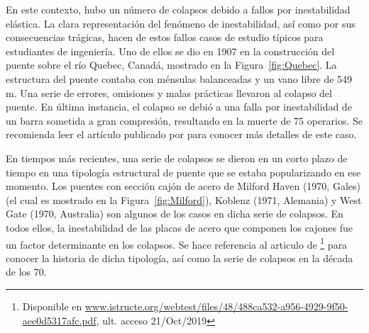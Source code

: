 En este contexto, hubo un número de colapsos debido a fallos por inestabilidad elástica. La clara representación del fenómeno de inestabilidad, así como por sus consecuencias trágicas, hacen de estos fallos casos de estudio típicos para estudiantes de ingeniería. Uno de ellos se dio en 1907 en la construcción del puente sobre el río Quebec, Canadá, mostrado en la Figura~\ref{fig:Quebec}. La estructura del puente contaba con ménsulas balanceadas y un vano libre de 549 m. Una serie de errores, omisiones y malas prácticas llevaron al colapso del puente. En última instancia, el colapso se debió a una falla por inestabilidad de un barra sometida a gran compresión, resultando en la muerte de 75 operarios. Se recomienda leer el artículo publicado por \cite{Brady} para conocer más detalles de este caso.


En tiempos más recientes, una serie de colapsos se dieron en un corto plazo de tiempo en una tipología estructural de puente que se estaba popularizando en ese momento. Los puentes con sección cajón de acero de Milford Haven (1970, Gales) (el cual es mostrado en la Figura~\ref{fig:Milford}), Koblenz (1971, Alemania) y West Gate (1970, Australia) son algunos de los casos en dicha serie de colapsos. En todos ellos, la inestabilidad de las placas de acero que componen los cajones fue un factor determinante en los colapsos. Se hace referencia al articulo de \cite{Firth}\footnote{Disponible en \href{https://www.istructe.org/webtest/files/48/488ca532-a956-4929-9f50-aee0d5317afc.pdf}{www.istructe.org/webtest/files/48/488ca532-a956-4929-9f50-aee0d5317afc.pdf}, ult. acceso 21/Oct/2019} para conocer la historia de dicha tipología, así como la serie de colapsos en la década de los 70.

